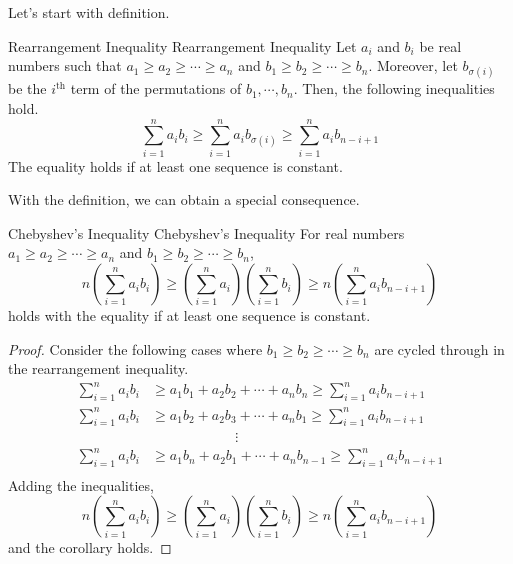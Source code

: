 \documentclass[../../../main.tex]{subfiles}
\begin{document}
Let's start with definition.

\begin{definition}
{Rearrangement Inequality}
{Rearrangement Inequality}
Let $a_i$ and $b_i$ be real numbers such that $a_1 \geq a_2 \geq
\cdots \geq a_n$ and $b_1 \geq b_2 \geq \cdots \geq b_n$. Moreover,
let $b_{\sigma(i)}$ be the $i^\text{th}$ term of the permutations of
$b_1, \cdots, b_n$. Then, the following inequalities hold.
\[
\sum_{i=1}^n a_i b_i
\geq \sum_{i=1}^n a_i b_{\sigma(i)}
\geq \sum_{i=1}^n a_i b_{n-i+1}
\]
The equality holds if at least one sequence is constant.
\end{definition}

With the definition, we can obtain a special consequence.

\begin{corollary}
{Chebyshev's Inequality}
{Chebyshev's Inequality}
For real numbers $a_1 \geq a_2 \geq \cdots \geq a_n$ and $b_1 \geq b_2
\geq \cdots \geq b_n$,
\[
n \left( \sum_{i=1}^n a_i b_i \right)
\geq \left( \sum_{i=1}^n a_i \right)
\left( \sum_{i=1}^n b_i \right)
\geq n \left( \sum_{i=1}^n a_i b_{n-i+1} \right)
\]
holds with the equality if at least one sequence is constant.
\end{corollary}
\begin{proof}
Consider the following cases where $b_1 \geq b_2 \geq \cdots \geq b_n$
are cycled through in the rearrangement inequality.
\begin{align*}
    \sum_{i=1}^n a_i b_i
    &\geq a_1 b_1 + a_2 b_2 + \cdots + a_n b_n
    \geq \sum_{i=1}^n a_i b_{n-i+1} \\
    \sum_{i=1}^n a_i b_i
    &\geq a_1 b_2 + a_2 b_3 + \cdots + a_n b_1
    \geq \sum_{i=1}^n a_i b_{n-i+1} \\
    &\qquad\qquad\qquad \vdots \\
    \sum_{i=1}^n a_i b_i
    &\geq a_1 b_n + a_2 b_1 + \cdots + a_n b_{n-1}
    \geq \sum_{i=1}^n a_i b_{n-i+1} \\
\end{align*}
Adding the inequalities,
\[
n \left( \sum_{i=1}^n a_i b_i \right)
\geq \left( \sum_{i=1}^n a_i \right)
\left( \sum_{i=1}^n b_i \right)
\geq n \left( \sum_{i=1}^n a_i b_{n-i+1} \right)
\]
and the corollary holds.
\end{proof}
\end{document}

